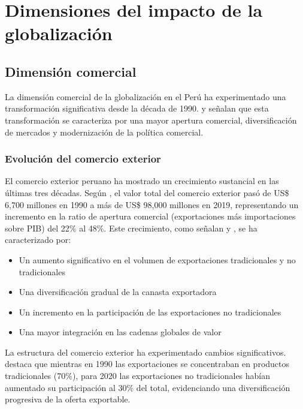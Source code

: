 \documentclass[12pt, a4paper]{article}
\begin{document}
\section{Dimensiones del impacto de la globalización}

\subsection{Dimensión comercial}

La dimensión comercial de la globalización en el Perú ha experimentado una transformación significativa desde la década de 1990. \textcite{santa_cruz2021} y \textcite{rodriguez2019} señalan que esta transformación se caracteriza por una mayor apertura comercial, diversificación de mercados y modernización de la política comercial.

\subsubsection{Evolución del comercio exterior}
El comercio exterior peruano ha mostrado un crecimiento sustancial en las últimas tres décadas. Según \textcite{tello2018}, el valor total del comercio exterior pasó de US\$ 6,700 millones en 1990 a más de US\$ 98,000 millones en 2019, representando un incremento en la ratio de apertura comercial (exportaciones más importaciones sobre PIB) del 22\% al 48\%. Este crecimiento, como señalan \textcite{mendoza2017} y \textcite{torres2020}, se ha caracterizado por:

\begin{itemize}
    \item Un aumento significativo en el volumen de exportaciones tradicionales y no tradicionales
    \item Una diversificación gradual de la canasta exportadora
    \item Un incremento en la participación de las exportaciones no tradicionales
    \item Una mayor integración en las cadenas globales de valor
\end{itemize}

La estructura del comercio exterior ha experimentado cambios significativos. \textcite{leon2019} destaca que mientras en 1990 las exportaciones se concentraban en productos tradicionales (70\%), para 2020 las exportaciones no tradicionales habían aumentado su participación al 30\% del total, evidenciando una diversificación progresiva de la oferta exportable.
\end{document}

